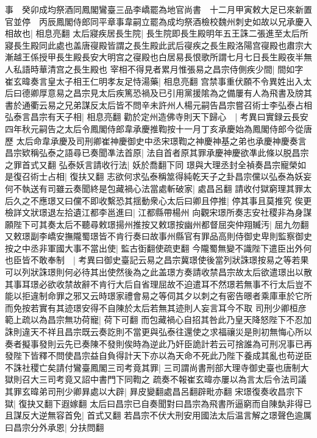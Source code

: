 事　癸卯成均祭酒同鳳閣鸞臺三品李嶠罷為地官尚書　十二月甲寅敕大足已來新置官並停　丙辰鳳閣侍郎同平章事韋嗣立罷為成均祭酒檢校魏州刺史如故以兄承慶入相故也|{
	相息亮翻}
太后寢疾居長生院|{
	長生院即長生殿明年五王誅二張進至太后所寢長生殿同此處也盖唐寑殿皆謂之長生殿此武后寑疾之長生殿洛陽宫寑殿也肅宗大漸越王係授甲長生殿長安大明宫之寑殿也白居易長恨歌所謂七月七日長生殿夜半無人私語時華清宫之長生殿也}
宰相不得見者累月惟張易之昌宗侍側疾少間|{
	間如字}
崔玄暐奏言皇太子相王仁明孝友足恃湯藥|{
	相息亮翻}
宫禁事重伏願不令異姓出入太后曰德卿厚意易之昌宗見太后疾篤恐禍及已引用黨援隂為之備屢有人為飛書及牓其書於通衢云易之兄弟謀反太后皆不問辛未許州人楊元嗣告昌宗嘗召術士李弘泰占相弘泰言昌宗有天子相|{
	相息亮翻}
勸於定州造佛寺則天下歸心　|{
	考異曰實録云長安四年秋元嗣告之太后令鳳閣侍郎韋承慶推鞫按十一月丁亥承慶始為鳳閣侍郎今從唐歷}
太后命韋承慶及司刑卿崔神慶御史中丞宋璟鞫之神慶神基之弟也承慶神慶奏言昌宗欵稱弘泰之語尋已奏聞凖法首原|{
	法自首者原其罪承慶神慶欲凖此條以脱昌宗之罪首式又翻}
弘泰妖言請收行法|{
	妖於喬翻下同}
璟與大理丞封全禎奏昌宗寵榮如是復召術士占相|{
	復扶又翻}
志欲何求弘泰稱筮得純乾天子之卦昌宗儻以弘泰為妖妄何不執送有司雖云奏聞終是包藏禍心法當處斬破家|{
	處昌呂翻}
請收付獄窮理其罪太后久之不應璟又曰儻不即收繫恐其揺動衆心太后曰卿且停推|{
	停其事且莫推究}
俟更檢詳文狀璟退左拾遺江都李邕進曰|{
	江都縣帶楊州}
向觀宋璟所奏志安社稷非為身謀願陛下可其奏太后不聽尋敕璟揚州推按又敕璟按幽州都督屈突仲翔贓汚|{
	屈九勿翻}
又敕璟副李嶠安撫隴蜀璟皆不肯行奏曰故事州縣官有罪品高則侍御史卑則監察御史按之中丞非軍國大事不當出使|{
	監古衘翻使疏吏翻}
今隴蜀無變不識陛下遣臣出外何也臣皆不敢奉制　|{
	考異曰御史臺記云易之昌宗冀璟使後當列狀誅璟按易之等若果可以列狀誅璟則何必待其出使然後為之此盖璟方奏請收禁昌宗故太后欲遣璟出以散其事耳璟必欲收禁故辭不肯行大后自省理屈故不迫遣耳不然璟若無事不行太后豈不能以拒違制命罪之邪又云時璟家禮會易之等伺其夕以刺之有密告暻者乘庫車於它所而免按若實有其迹璟安得不自陳於太后若無其迹則人妄言耳今不取}
司刑少卿桓彦範上疏以為昌宗無功荷寵|{
	荷下可翻}
而包藏禍心自招其咎此乃皇天降怒陛下不忍加誅則違天不祥且昌宗既云奏訖則不當更與弘泰往還使之求福禳災是則初無悔心所以奏者擬事發則云先已奏陳不發則俟時為逆此乃奸臣詭計若云可捨誰為可刑况事已再發陛下皆釋不問使昌宗益自負得計天下亦以為天命不死此乃陛下養成其亂也苟逆臣不誅社稷亡矣請付鸞臺鳳閣三司考竟其罪|{
	三司謂尚書刑部大理寺御史臺也唐制大獄則召大三司考竟又詔中書門下同鞫之}
疏奏不報崔玄暐亦屢以為言太后令法司議其罪玄暐弟司刑少卿昪處以大辟|{
	昪皮變翻處昌呂翻辟毗亦翻}
宋璟復奏收昌宗下獄|{
	復抉又翻下遐嫁翻}
太后曰昌宗已自奏聞對曰昌宗為飛書所逼窮而自陳埶非得已且謀反大逆無容首免|{
	首式又翻}
若昌宗不伏大刑安用國法太后温言解之璟聲色逾厲曰昌宗分外承恩|{
	分扶問翻}
